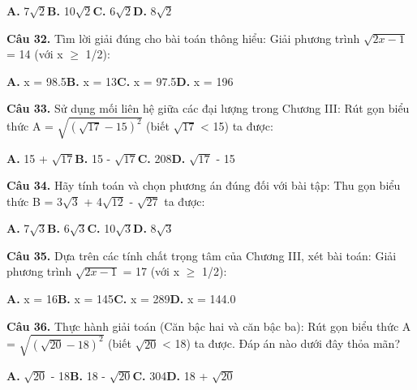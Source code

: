 \documentclass[11pt,a4paper]{article}
\begin{document}
\hspace*{1.5em}\textbf{A.} 7$\sqrt{2}$\quad\quad \textbf{B.} 10$\sqrt{2}$\quad\quad \textbf{C.} 6$\sqrt{2}$\quad\quad \textbf{D.} 8$\sqrt{2}$\par\vspace{2pt}
\textbf{\color{primary} Câu 32.} Tìm lời giải đúng cho bài toán thông hiểu: Giải phương trình $\sqrt{2x - 1}$ = 14 (với x $\ge$ 1/2):\par
\hspace*{1.5em}\textbf{A.} x = 98.5\quad\quad \textbf{B.} x = 13\quad\quad \textbf{C.} x = 97.5\quad\quad \textbf{D.} x = 196\par\vspace{2pt}
\textbf{\color{primary} Câu 33.} Sử dụng mối liên hệ giữa các đại lượng trong Chương III: Rút gọn biểu thức A = $\sqrt{(\sqrt{17} - 15)^2}$ (biết $\sqrt{17}$ < 15) ta được:\par
\hspace*{1.5em}\textbf{A.} 15 + $\sqrt{17}$\quad\quad \textbf{B.} 15 - $\sqrt{17}$\quad\quad \textbf{C.} 208\quad\quad \textbf{D.} $\sqrt{17}$ - 15\par\vspace{2pt}
\textbf{\color{primary} Câu 34.} Hãy tính toán và chọn phương án đúng đối với bài tập: Thu gọn biểu thức B = 3$\sqrt{3}$ + 4$\sqrt{12}$ - $\sqrt{27}$ ta được:\par
\hspace*{1.5em}\textbf{A.} 7$\sqrt{3}$\quad\quad \textbf{B.} 6$\sqrt{3}$\quad\quad \textbf{C.} 10$\sqrt{3}$\quad\quad \textbf{D.} 8$\sqrt{3}$\par\vspace{2pt}
\textbf{\color{primary} Câu 35.} Dựa trên các tính chất trọng tâm của Chương III, xét bài toán: Giải phương trình $\sqrt{2x - 1}$ = 17 (với x $\ge$ 1/2):\par
\hspace*{1.5em}\textbf{A.} x = 16\quad\quad \textbf{B.} x = 145\quad\quad \textbf{C.} x = 289\quad\quad \textbf{D.} x = 144.0\par\vspace{2pt}
\textbf{\color{primary} Câu 36.} Thực hành giải toán (Căn bậc hai và căn bậc ba): Rút gọn biểu thức A = $\sqrt{(\sqrt{20} - 18)^2}$ (biết $\sqrt{20}$ < 18) ta được. Đáp án nào dưới đây thỏa mãn?\par
\hspace*{1.5em}\textbf{A.} $\sqrt{20}$ - 18\quad\quad \textbf{B.} 18 - $\sqrt{20}$\quad\quad \textbf{C.} 304\quad\quad \textbf{D.} 18 + $\sqrt{20}$\par\vspace{2pt}
\end{document}
